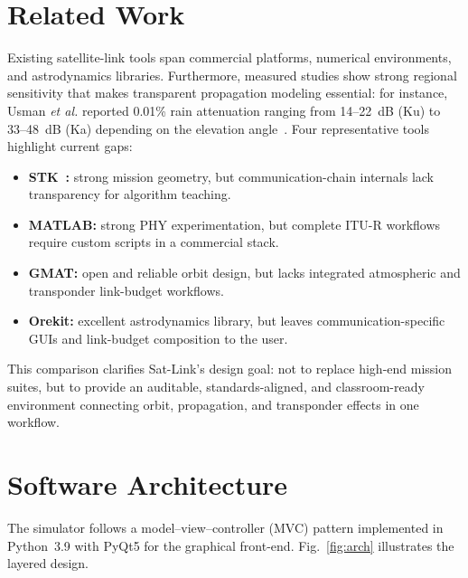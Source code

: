 \documentclass[conference]{IEEEtran}
\begin{document}
\section{Related Work}

Existing satellite-link tools span commercial platforms, numerical environments,
and astrodynamics libraries. Furthermore, measured studies show strong regional
sensitivity that makes transparent propagation modeling essential: for instance,
Usman \emph{et al.} reported 0.01\% rain attenuation ranging from 14--22~dB (Ku)
to 33--48~dB (Ka) depending on the elevation angle~\cite{usman2019_rain}.
Four representative tools highlight current gaps:

\begin{itemize}[leftmargin=*,nosep]
  \item \textbf{STK~\cite{ansys_stk}:} strong mission geometry, but
        communication-chain internals lack transparency for algorithm teaching.
  \item \textbf{MATLAB:} strong PHY experimentation,
        but complete ITU-R workflows require custom scripts in a commercial stack.
  \item \textbf{GMAT:} open and reliable orbit design, but
        lacks integrated atmospheric and transponder link-budget workflows.
  \item \textbf{Orekit:} excellent astrodynamics library, but
        leaves communication-specific GUIs and link-budget composition to the user.
\end{itemize}


This comparison clarifies Sat-Link's design goal: not to replace high-end mission
suites, but to provide an auditable, standards-aligned, and classroom-ready
environment connecting orbit, propagation, and transponder effects in one workflow.

\section{Software Architecture}
\label{sec:architecture}


The simulator follows a model–view–controller (MVC) pattern implemented
in Python~3.9 with PyQt5 for the graphical front-end.  Fig.~\ref{fig:arch}
illustrates the layered design.
\end{document}
